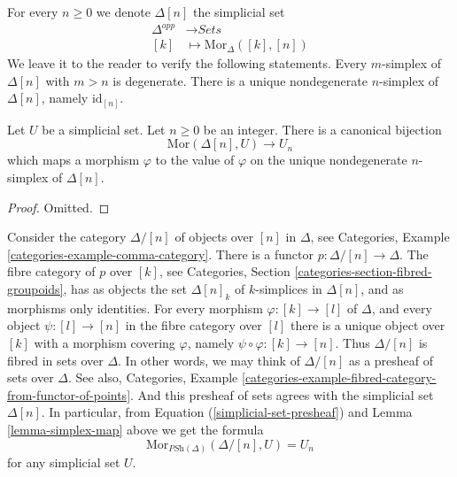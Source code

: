 \begin{example}
\label{example-simplex-simplicial-set}
For every $n \geq 0$ we denote $\Delta[n]$ the simplicial set
\begin{align*}
\Delta^{opp} & \longrightarrow \textit{Sets} \\
[k] & \longmapsto \text{Mor}_{\Delta}([k], [n])
\end{align*}
We leave it to the reader to verify the following statements.
Every $m$-simplex of $\Delta[n]$ with $m > n$ is degenerate.
There is a unique nondegenerate $n$-simplex of $\Delta[n]$,
namely $\text{id}_{[n]}$.
\end{example}

\begin{lemma}
\label{lemma-simplex-map}
Let $U$ be a simplicial set. Let $n \geq 0$ be an integer.
There is a canonical bijection
$$
\text{Mor}(\Delta[n], U)
\longrightarrow
U_n
$$
which maps a morphism $\varphi$ to the value of $\varphi$
on the unique nondegenerate $n$-simplex of $\Delta[n]$.
\end{lemma}

\begin{proof}
Omitted.
\end{proof}

\begin{example}
\label{example-simplex-category}
Consider the category $\Delta/[n]$ of objects over $[n]$
in $\Delta$, see
Categories, Example \ref{categories-example-comma-category}.
There is a functor $p : \Delta/[n] \to \Delta$.
The fibre category of $p$ over $[k]$, see
Categories, Section \ref{categories-section-fibred-groupoids},
has as objects the
set $\Delta[n]_k$ of $k$-simplices in $\Delta[n]$, and as
morphisms only identities. For every morphism
$\varphi : [k] \to [l]$ of $\Delta$, and every object $\psi : [l] \to [n]$
in the fibre category over $[l]$ there is a unique
object over $[k]$ with a morphism covering $\varphi$, namely
$\psi \circ \varphi : [k] \to [n]$. Thus $\Delta/[n]$
is fibred in sets over $\Delta$. In other words, we may
think of $\Delta/[n]$ as a presheaf of sets over $\Delta$.
See also, Categories,
Example \ref{categories-example-fibred-category-from-functor-of-points}.
And this presheaf of sets agrees with the simplicial set
$\Delta[n]$. In particular, from Equation
(\ref{simplicial-set-presheaf}) and 
Lemma \ref{lemma-simplex-map} above
we get the formula
$$
\text{Mor}_{\textit{PSh}(\Delta)}(\Delta/[n], U) = U_n
$$
for any simplicial set $U$.
\end{example}


